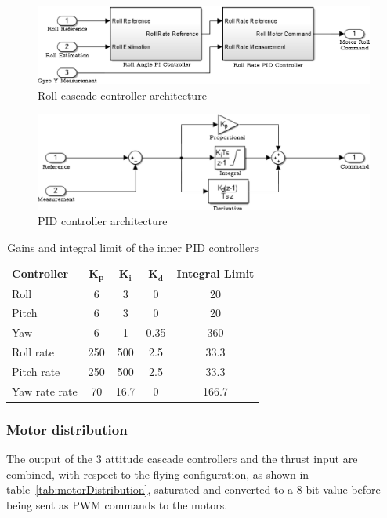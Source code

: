 \documentclass[a4paper, 12pt]{report}
\begin{document}
\begin{figure}[h]
\centering
\includegraphics[scale = 0.8]{Images/controllerCascade}
\caption{Roll cascade controller architecture}
\label{fig:controllerCascade}
\end{figure}

\begin{figure}[h]
\centering
\includegraphics[scale = 0.8]{Images/controllerPID}
\caption{PID controller architecture}
\label{fig:controllerPID}
\end{figure}

\begin{table}[htdp]
\caption{Gains and integral limit of the inner PID controllers}
\centering
\begin{tabular}{|l||c|c|c|c|}
\hline
\textbf{Controller} & $\boldsymbol{K_p}$ & $\boldsymbol{K_i}$ & $\boldsymbol{K_d}$ & \textbf{Integral Limit}  \\
\hhline{|=#=|=|=|=|}
Roll & 6 & 3 & 0 & 20  \\
\hline
Pitch & 6 & 3 & 0 & 20  \\
\hline
Yaw & 6 & 1 & 0.35 & 360  \\
\hline
Roll rate & 250 & 500 & 2.5 & 33.3  \\
\hline
Pitch rate & 250 & 500 & 2.5 & 33.3  \\
\hline
Yaw rate rate & 70 & 16.7 & 0 & 166.7  \\
\hline
\end{tabular}
\label{tab:controllerInnerGains}
\end{table}

\subsubsection{Motor distribution}
The output of the 3 attitude cascade controllers and the thrust input are combined, with respect to the flying configuration, as shown in table~\ref{tab:motorDistribution}, saturated and converted to a 8-bit value before being sent as PWM commands to the motors. 
\end{document}
